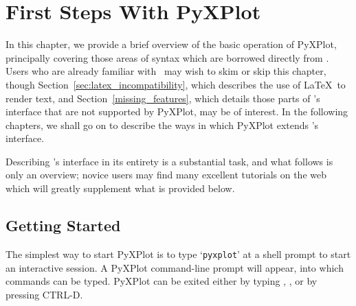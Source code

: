 %
%
%
%
%



\chapter{First Steps With PyXPlot}
\label{gnuplot_intro}

In this chapter, we provide a brief overview of the basic operation of PyXPlot,
principally covering those areas of syntax which are borrowed directly from
\gnuplot. Users who are already familiar with \gnuplot\ may wish to skim or
skip this chapter, though Section~\ref{sec:latex_incompatibility}, which
describes the use of \LaTeX\ to render text, and
Section~\ref{missing_features}, which details those parts of \gnuplot's
interface that are not supported by PyXPlot, may be of interest. In the
following chapters, we shall go on to describe the ways in which PyXPlot
extends \gnuplot's interface.

Describing \gnuplot's interface in its entirety is a substantial task, and what
follows is only an overview; novice users may find many excellent tutorials on
the web which will greatly supplement what is provided below.

\section{Getting Started}

The simplest way to start PyXPlot is to type `{\tt pyxplot}' at a shell prompt
to start an interactive session. A PyXPlot command-line prompt will appear,
into which commands can be typed. PyXPlot can be exited either by typing
, , or by pressing CTRL-D.

